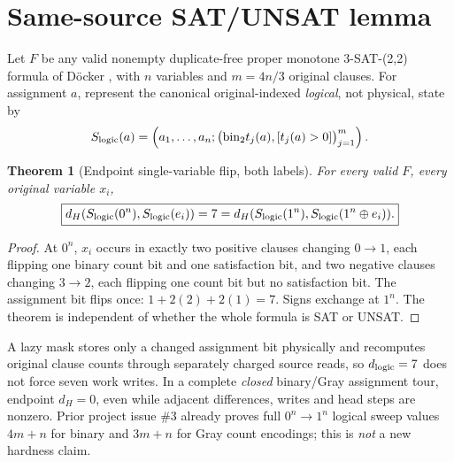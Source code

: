 \documentclass[10pt]{article}
\newtheorem{theorem}{Theorem}
\begin{document}
\section{Same-source SAT/UNSAT lemma}
Let \(F\) be any valid nonempty duplicate-free proper monotone 3-SAT-(2,2) formula of D\"ocker \cite{Doecker}, with \(n\) variables and \(m=4n/3\) original clauses. For assignment \(a\), represent the canonical original-indexed \emph{logical}, not physical, state by
\[
S_{\rm logic}(a)=\left(a_1,\ldots,a_n;\bigl(\mathrm{bin}_2t_j(a),[t_j(a)>0]\bigr)_{j=1}^m\right).
\]
\begin{theorem}[Endpoint single-variable flip, both labels]
For every valid \(F\), every original variable \(x_i\),
\[
\boxed{d_H(S_{\rm logic}(0^n),S_{\rm logic}(e_i))=7
=d_H(S_{\rm logic}(1^n),S_{\rm logic}(1^n\oplus e_i)).}
\]
\end{theorem}
\begin{proof}
At \(0^n\), \(x_i\) occurs in exactly two positive clauses changing \(0\to1\), each flipping one binary count bit and one satisfaction bit, and two negative clauses changing \(3\to2\), each flipping one count bit but no satisfaction bit. The assignment bit flips once: \(1+2(2)+2(1)=7\). Signs exchange at \(1^n\). The theorem is independent of whether the whole formula is SAT or UNSAT.
\end{proof}
A lazy mask stores only a changed assignment bit physically and recomputes original clause counts through separately charged source reads, so \(d_{\rm logic}=7\) does not force seven work writes. In a complete \emph{closed} binary/Gray assignment tour, endpoint \(d_H=0\), even while adjacent differences, writes and head steps are nonzero. Prior project issue \#3 already proves full \(0^n\to1^n\) logical sweep values \(4m+n\) for binary and \(3m+n\) for Gray count encodings; this is \emph{not} a new hardness claim.
\end{document}
